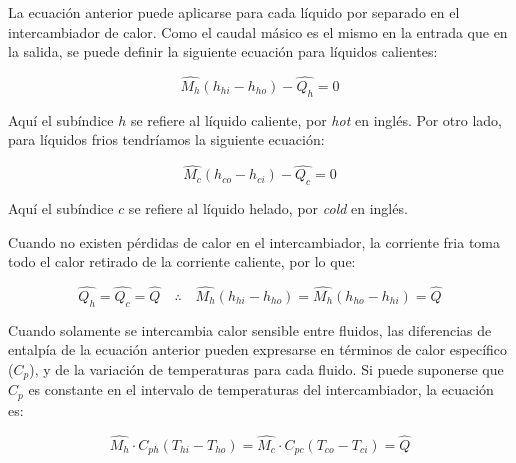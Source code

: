 \documentclass{AsignaturaResumen}
\begin{document}
La ecuación anterior puede aplicarse para cada líquido por separado en el intercambiador de calor. Como el caudal másico es el mismo en la entrada que en la salida, se puede definir la siguiente ecuación para líquidos calientes:

\begin{equation}
    \hat{M_{h}} (h_{hi} - h_{ho}) - \hat{Q_{h}} = 0
\end{equation}

Aquí el subíndice $h$ se refiere al líquido caliente, por \textit{hot} en inglés. Por otro lado, para líquidos frios tendríamos la siguiente ecuación:

\begin{equation}
     \hat{M_{c}} (h_{co} - h_{ci}) - \hat{Q_{c}} = 0
\end{equation}

Aquí el subíndice $c$ se refiere al líquido helado, por \textit{cold} en inglés.

Cuando no existen pérdidas de calor en el intercambiador, la corriente fria toma todo el calor retirado de la corriente caliente, por lo que:

\begin{equation}
    \hat{Q_{h}} = \hat{Q_{c}} = \hat{Q} \quad\therefore\quad \hat{M_{h}} (h_{hi} - h_{ho}) = \hat{M_{h}} (h_{ho} - h_{hi}) = \hat{Q}
\end{equation}  

Cuando solamente se intercambia calor sensible entre fluidos, las diferencias de entalpía de la ecuación anterior pueden expresarse en términos de calor específico ($C_{p}$), y de la variación de temperaturas para cada fluido. Si puede suponerse que $C_{p}$ es constante en el intervalo de temperaturas del intercambiador, la ecuación es:

\begin{equation}\label{eq:eliminacion_de_calor}
    \hat{M_{h}} \cdot C_{ph} (T_{hi} - T_{ho}) = \hat{M_{c}} \cdot C_{pc} (T_{co} - T_{ci}) = \hat{Q}
\end{equation}
\end{document}
